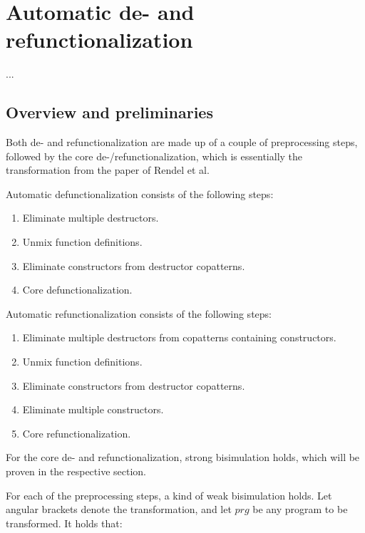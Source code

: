 \chapter{Automatic de- and refunctionalization}

...

\section{Overview and preliminaries}

Both de- and refunctionalization are made up of a couple of preprocessing steps, followed by the core de-/refunctionalization, which is essentially the transformation from the paper of Rendel et al.

Automatic defunctionalization consists of the following steps:
\begin{enumerate}
\item Eliminate multiple destructors.

\item Unmix function definitions.

\item Eliminate constructors from destructor copatterns.

\item Core defunctionalization.

\end{enumerate}

Automatic refunctionalization consists of the following steps:
\begin{enumerate}
\item Eliminate multiple destructors from copatterns containing constructors.

\item Unmix function definitions.

\item Eliminate constructors from destructor copatterns.

\item Eliminate multiple constructors.

\item Core refunctionalization.

\end{enumerate}

For the core de- and refunctionalization, strong bisimulation holds, which will be proven in the respective section.

For each of the preprocessing steps, a kind of weak bisimulation holds. Let angular brackets denote the transformation, and let $prg$ be any program to be transformed. It holds that:

